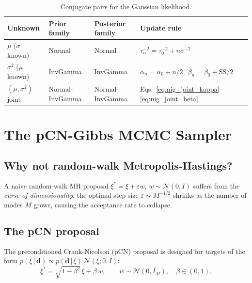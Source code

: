 \documentclass[11pt, a4paper]{article}
\newcommand{\N}{\mathcal{N}}
\theoremstyle{definition}
\begin{document}
\begin{table}[H]
  \centering
  \caption{Conjugate pairs for the Gaussian likelihood.}
  \label{tab:conjugate}
  \begin{tabular}{llll}
    \toprule
    Unknown & Prior family & Posterior family & Update rule \\
    \midrule
    $\mu$ ($\sigma$ known) & Normal & Normal &
      $\tau_n^{-2} = \tau_0^{-2} + n\sigma^{-2}$ \\[2pt]
    $\sigma^2$ ($\mu$ known) & InvGamma & InvGamma &
      $\alpha_n=\alpha_0+n/2,\;\beta_n=\beta_0+\mathrm{SS}/2$ \\[2pt]
    $(\mu,\sigma^2)$ joint & Normal-InvGamma & Normal-InvGamma &
      Eqs.~\eqref{eq:nig_joint_kappa}--\eqref{eq:nig_joint_beta} \\
    \bottomrule
  \end{tabular}
\end{table}

\section{The pCN-Gibbs MCMC Sampler}

\subsection{Why not random-walk Metropolis-Hastings?}

A naive random-walk MH proposal $\xi^*=\xi+\varepsilon w$, $w\sim\N(0,I)$
suffers from the \emph{curse of dimensionality}: the optimal step size
$\varepsilon\sim M^{-1/2}$ shrinks as the number of modes $M$ grows, causing
the acceptance rate to collapse.

\subsection{The pCN proposal}

The preconditioned Crank-Nicolson (pCN) proposal is designed for targets
of the form $p(\xi\,|\,\mathbf{d})\propto p(\mathbf{d}\,|\,\xi)\,\N(\xi;0,I)$:
\begin{equation}
  \xi^* = \sqrt{1-\beta^2}\,\xi + \beta\,w, \qquad w\sim\N(0,I_M),
  \quad \beta\in(0,1).
  \label{eq:pcn}
\end{equation}
\end{document}
